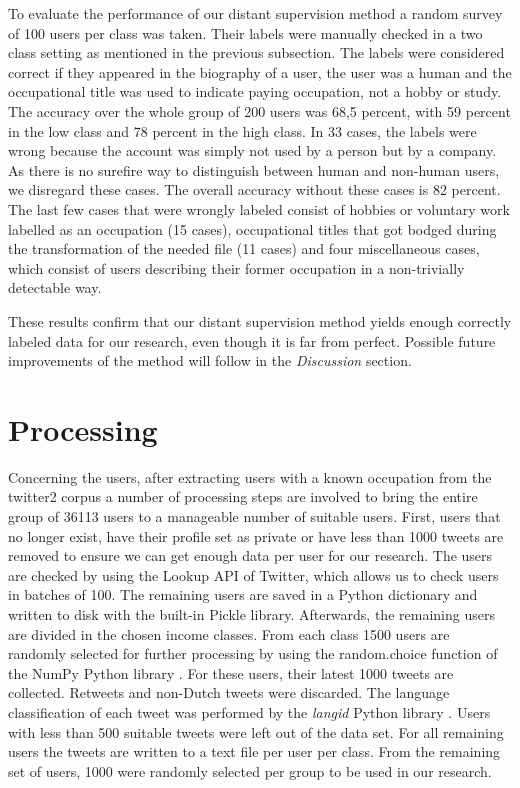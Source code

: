\documentclass[
10pt, %
a4paper, %
oneside, %
headinclude,footinclude, %
] {book}%
\begin{document}
To evaluate the performance of our distant supervision method a random survey of 100 users per class was taken. Their labels were manually checked in a two class setting as mentioned in the previous subsection. The labels were considered correct if they appeared in the biography of a user, the user was a human and the occupational title was used to indicate paying occupation, not a hobby or study. The accuracy over the whole group of 200 users was 68,5 percent, with 59 percent in the low class and 78 percent in the high class. In 33 cases, the labels were wrong because the account was simply not used by a person but by a company. As there is no surefire way to distinguish between human and non-human users, we disregard these cases. The overall accuracy without these cases is 82 percent. The last few cases that were wrongly labeled consist of hobbies or voluntary work labelled as an occupation (15 cases), occupational titles that got bodged during the transformation of the needed file (11 cases) and four miscellaneous cases, which consist of users describing their former occupation in a non-trivially detectable way.

These results confirm that our distant supervision method yields enough correctly labeled data for our research, even though it is far from perfect. Possible future improvements of the method will follow in the \textit{Discussion} section.


\section{Processing}
Concerning the users, after extracting users with a known occupation from the twitter2 corpus a number of processing steps are involved to bring the entire group of 36113 users to a manageable number of suitable users. First, users that no longer exist, have their profile set as private or have less than 1000 tweets are removed to ensure we can get enough data per user for our research. The users are checked by using the Lookup API of Twitter, which allows us to check users in batches of 100. The remaining users are saved in a Python dictionary and written to disk with the built-in Pickle library. Afterwards, the remaining users are divided in the chosen income classes. From each class 1500 users are randomly selected for further processing by using the random.choice function of the NumPy Python library \citep{numpy}. For these users, their latest 1000 tweets are collected. Retweets and non-Dutch tweets were discarded. The language classification of each tweet was performed by the \textit{langid} Python library \citep{langid}. Users with less than 500 suitable tweets were left out of the data set. For all remaining users the tweets are written to a text file per user per class. From the remaining set of users, 1000 were randomly selected per group to be used in our research.
\end{document}
